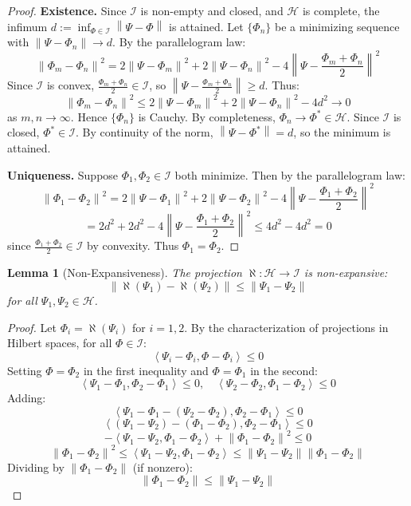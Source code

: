 \documentclass[11pt,a4paper]{article}
\theoremstyle{plain}
\newtheorem{lemma}[theorem]{Lemma}
\theoremstyle{definition}
\newcommand{\Hilb}{\mathcal{H}}
\newcommand{\I}{\mathcal{I}}
\newcommand{\norm}[1]{\left\lVert #1 \right\rVert}
\newcommand{\inner}[2]{\left\langle #1, #2 \right\rangle}
\begin{document}
\begin{proof}
\textbf{Existence.} Since $\I$ is non-empty and closed, and $\Hilb$ is complete, the infimum $d := \inf_{\Phi \in \I} \norm{\Psi - \Phi}$ is attained. Let $\{\Phi_n\}$ be a minimizing sequence with $\norm{\Psi - \Phi_n} \to d$. By the parallelogram law:
\[
\norm{\Phi_m - \Phi_n}^2 = 2\norm{\Psi - \Phi_m}^2 + 2\norm{\Psi - \Phi_n}^2 - 4\norm{\Psi - \frac{\Phi_m + \Phi_n}{2}}^2
\]
Since $\I$ is convex, $\frac{\Phi_m + \Phi_n}{2} \in \I$, so $\norm{\Psi - \frac{\Phi_m + \Phi_n}{2}} \geq d$. Thus:
\[
\norm{\Phi_m - \Phi_n}^2 \leq 2\norm{\Psi - \Phi_m}^2 + 2\norm{\Psi - \Phi_n}^2 - 4d^2 \to 0
\]
as $m, n \to \infty$. Hence $\{\Phi_n\}$ is Cauchy. By completeness, $\Phi_n \to \Phi^* \in \Hilb$. Since $\I$ is closed, $\Phi^* \in \I$. By continuity of the norm, $\norm{\Psi - \Phi^*} = d$, so the minimum is attained.

\textbf{Uniqueness.} Suppose $\Phi_1, \Phi_2 \in \I$ both minimize. Then by the parallelogram law:
\[
\norm{\Phi_1 - \Phi_2}^2 = 2\norm{\Psi - \Phi_1}^2 + 2\norm{\Psi - \Phi_2}^2 - 4\norm{\Psi - \frac{\Phi_1 + \Phi_2}{2}}^2
\]
\[
= 2d^2 + 2d^2 - 4\norm{\Psi - \frac{\Phi_1 + \Phi_2}{2}}^2 \leq 4d^2 - 4d^2 = 0
\]
since $\frac{\Phi_1 + \Phi_2}{2} \in \I$ by convexity. Thus $\Phi_1 = \Phi_2$.
\end{proof}

\begin{lemma}[Non-Expansiveness]\label{lem:nonexp}
The projection $\aleph: \Hilb \to \I$ is non-expansive:
\[
\norm{\aleph(\Psi_1) - \aleph(\Psi_2)} \leq \norm{\Psi_1 - \Psi_2}
\]
for all $\Psi_1, \Psi_2 \in \Hilb$.
\end{lemma}

\begin{proof}
Let $\Phi_i = \aleph(\Psi_i)$ for $i = 1, 2$. By the characterization of projections in Hilbert spaces, for all $\Phi \in \I$:
\[
\inner{\Psi_i - \Phi_i}{\Phi - \Phi_i} \leq 0
\]
Setting $\Phi = \Phi_2$ in the first inequality and $\Phi = \Phi_1$ in the second:
\[
\inner{\Psi_1 - \Phi_1}{\Phi_2 - \Phi_1} \leq 0, \quad \inner{\Psi_2 - \Phi_2}{\Phi_1 - \Phi_2} \leq 0
\]
Adding:
\[
\inner{\Psi_1 - \Phi_1 - (\Psi_2 - \Phi_2)}{\Phi_2 - \Phi_1} \leq 0
\]
\[
\inner{(\Psi_1 - \Psi_2) - (\Phi_1 - \Phi_2)}{\Phi_2 - \Phi_1} \leq 0
\]
\[
-\inner{\Psi_1 - \Psi_2}{\Phi_1 - \Phi_2} + \norm{\Phi_1 - \Phi_2}^2 \leq 0
\]
\[
\norm{\Phi_1 - \Phi_2}^2 \leq \inner{\Psi_1 - \Psi_2}{\Phi_1 - \Phi_2} \leq \norm{\Psi_1 - \Psi_2} \norm{\Phi_1 - \Phi_2}
\]
Dividing by $\norm{\Phi_1 - \Phi_2}$ (if nonzero):
\[
\norm{\Phi_1 - \Phi_2} \leq \norm{\Psi_1 - \Psi_2}
\]
\end{proof}
\end{document}
